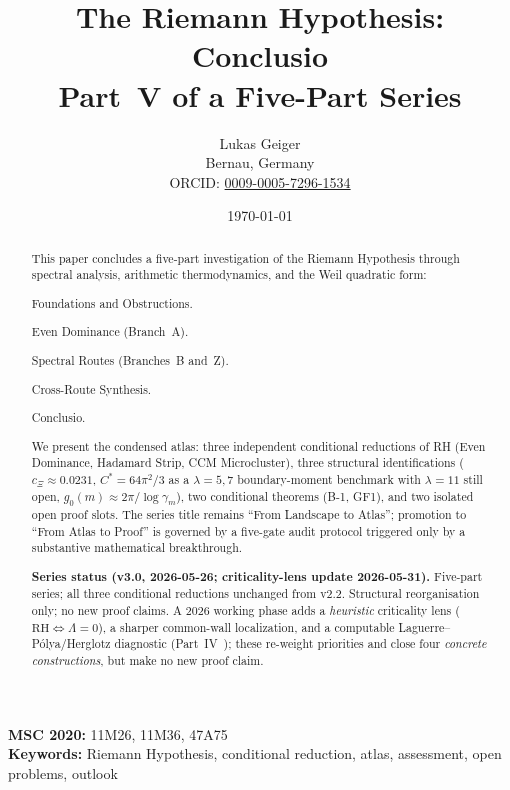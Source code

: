\documentclass[12pt,a4paper]{article}
\title{The Riemann Hypothesis: Conclusio\\[4pt]
\large Part~V of a Five-Part Series}
\author{Lukas Geiger\\
\small Bernau, Germany\\
\small ORCID: \href{https://orcid.org/0009-0005-7296-1534}{0009-0005-7296-1534}}
\date{\today}
\theoremstyle{definition}
\theoremstyle{remark}
\begin{document}
\overfullrule=0pt
\maketitle

\begin{abstract}\footnotesize
This paper concludes a five-part investigation of the Riemann Hypothesis
through spectral analysis, arithmetic thermodynamics, and the Weil
quadratic form:
\begin{description}[font=\bfseries,leftmargin=2em]
  \item[Part~I \cite{Geiger2026partI}:] Foundations and Obstructions.
  \item[Part~II \cite{Geiger2026partII}:] Even Dominance (Branch~A).
  \item[Part~III \cite{Geiger2026partIII}:] Spectral Routes
    (Branches~B and~Z).
  \item[Part~IV \cite{Geiger2026partIV}:] Cross-Route Synthesis.
  \item[Part~V (this paper):] Conclusio.
\end{description}

\noindent We present the condensed atlas: three independent conditional
reductions of RH (Even Dominance, Hadamard Strip, CCM Microcluster),
three structural identifications
($c_\Xi \approx 0.0231$, $C^* = 64\pi^2/3$ as a $\lambda=5,7$
boundary-moment benchmark with $\lambda=11$ still open,
$g_0(m) \approx 2\pi/\log\gamma_m$),
two conditional theorems (B-1, GF1), and two
isolated open proof slots. The series title remains ``From Landscape to
Atlas''; promotion to ``From Atlas to Proof'' is governed by a five-gate
audit protocol triggered only by a substantive mathematical breakthrough.

\medskip\noindent
\textbf{Series status (v3.0, 2026-05-26; criticality-lens update 2026-05-31).}
Five-part series; all three conditional reductions unchanged from v2.2.
Structural reorganisation only; no new proof claims. A 2026 working phase adds a
\emph{heuristic} criticality lens ($\mathrm{RH}\Leftrightarrow\Lambda=0$), a sharper
common-wall localization, and a computable Laguerre--P\'olya/Herglotz diagnostic
(Part~IV~\cite{Geiger2026partIV}); these re-weight priorities and close four
\emph{concrete constructions}, but make no new proof claim.
\end{abstract}

{\footnotesize
\noindent\textbf{MSC 2020:} 11M26, 11M36, 47A75\\
\textbf{Keywords:} Riemann Hypothesis, conditional reduction, atlas,
assessment, open problems, outlook
}
\end{document}
